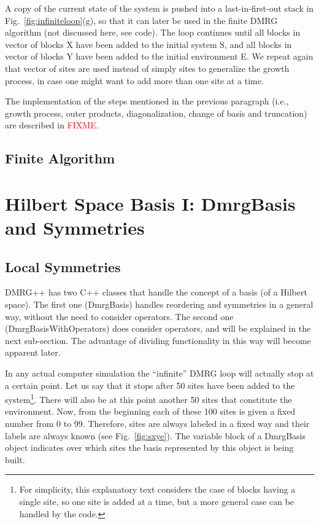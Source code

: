 \documentclass[paper=letter]{scrartcl}
\newcommand{\todo}[1]{\textcolor{red}{#1}}
\newcommand{\cppClass}[1]{{\sffamily #1}}
\begin{document}
A copy of the current state of the system is pushed into a last-in-first-out stack in Fig.~\ref{fig:infiniteloop}(g), 
so that it can later be used in the finite DMRG algorithm (not discussed here, see code).
The loop continues until all blocks in vector of blocks X have been added to the initial system S, and all blocks in vector of blocks Y have been added to 
the initial environment E. We repeat again that  vector of sites are used instead of simply sites to generalize the growth process,
in case one might want to add more than one site at a time.

The implementation of
the steps mentioned in the previous paragraph (i.e., growth process,  outer products, diagonalization, change of basis and truncation)
are described in \todo{FIXME}.

\subsection{Finite Algorithm}

\section{Hilbert Space Basis I: DmrgBasis and Symmetries}

\subsection{Local Symmetries}
DMRG++ has two C++ classes that handle the concept of a basis (of a Hilbert space). The first one (\cppClass{DmrgBasis}) handles reordering 
and symmetries in a general way, without the need to consider operators.
The second one (\cppClass{DmrgBasisWithOperators})  does consider operators, and will be explained in
the next sub-section. The advantage of dividing  functionality in this way will become apparent later.

In any actual computer simulation the ``infinite'' DMRG loop will actually stop at a certain point.
Let us say that it stops after 50 sites have been added to the system\footnote{For simplicity, this explanatory text considers the case of 
blocks having a single site, so one site is added at a time, but a more general case can be handled by the code.}.
There will also be at this point another 50 sites that constitute the environment. 
Now, from the beginning each of these 100 sites is given a fixed number from 0 to 99. 
Therefore, sites are always labeled in a fixed way and 
their labels are always known (see Fig.~\ref{fig:sxye}).
The variable block of a {DmrgBasis} object indicates over which sites the basis represented by this object is being built.
\end{document}
